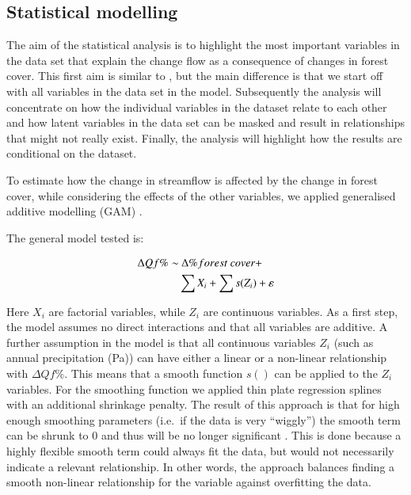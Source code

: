 \documentclass[]{elsarticle} %
\begin{document}
\hypertarget{statistical-modelling}{%
\subsection{Statistical modelling}\label{statistical-modelling}}

The aim of the statistical analysis is to highlight the most important variables in the data set that explain the change flow as a consequence of changes in forest cover. This first aim is similar to \citet{zhang2017}, but the main difference is that we start off with all variables in the data set in the model. Subsequently the analysis will concentrate on how the individual variables in the dataset relate to each other and how latent variables in the data set can be masked and result in relationships that might not really exist. Finally, the analysis will highlight how the results are conditional on the dataset.

To estimate how the change in streamflow is affected by the change in forest cover, while considering the effects of the other variables, we applied generalised additive modelling (GAM) \citep{wood2006}.

The general model tested is:

\begin{align}
\Delta Qf \% \sim &~ \Delta \% forest~cover + \notag \\ 
& \sum{X_i} + \sum{s(Z_i)} + \varepsilon \label{eq:eq2}
\end{align}

Here \(X_i\) are factorial variables, while \(Z_i\) are continuous variables. As a first step, the model assumes no direct interactions and that all variables are additive. A further assumption in the model is that all continuous variables \(Z_i\) (such as annual precipitation (Pa)) can have either a linear or a non-linear relationship with \(\Delta Qf \%\). This means that a smooth function \(s()\) can be applied to the \(Z_i\) variables. For the smoothing function we applied thin plate regression splines with an additional shrinkage penalty. The result of this approach is that for high enough smoothing parameters (i.e.~if the data is very ``wiggly'') the smooth term can be shrunk to 0 and thus will be no longer significant \citep{wood2006}. This is done because a highly flexible smooth term could always fit the data, but would not necessarily indicate a relevant relationship. In other words, the approach balances finding a smooth non-linear relationship for the variable against overfitting the data.
\end{document}
